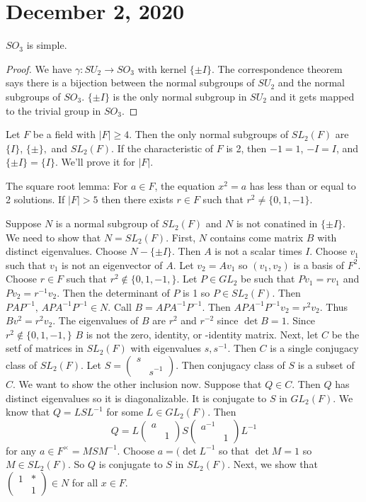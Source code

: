 \documentclass{article}
\newcommand{\ra}[1][]{\xrightarrow{#1}}
\begin{document}
\section{December 2, 2020}
\begin{corollary}
$SO_3$ is simple.
\end{corollary}
\begin{proof}
We have $\gamma: SU_2\ra SO_3$ with kernel $\{\pm I\}$. The correspondence theorem says there is a bijection between the normal subgroups of $SU_2$ and the normal subgroups of $SO_3$. $\{\pm I\}$ is the only normal subgroup in $SU_2$ and it gets mapped to the trivial group in $SO_3$. 
\end{proof}
\begin{theorem}
Let $F$ be a field with $|F|\geq 4$. Then the only normal subgroups of $SL_2(F)$ are $\{I\}$, $\{\pm\},$ and $SL_2(F)$. If the characteristic of $F$ is 2, then $-1=1$, $-I=I$, and $\{\pm I\}=\{I\}$. We'll prove it for $|F|$. 

The square root lemma: For $a\in F$, the equation $x^2=a$ has less than or equal to 2 solutions. If $|F|>5$ then there exists $r\in F$ such that $r^2\neq \{0,1,-1\}$.

Suppose $N$ is a normal subgroup of $SL_2(F)$ and $N$ is not conatined in $\{\pm I\}$. We need to show that $N=SL_2(F)$. First, $N$ contains come matrix $B$ with distinct eigenvalues. Choose $N-\{\pm I\}$. Then $A$ is not a scalar times $I$. Choose $v_1$ such that $v_1$ is not an eigenvector of $A$. Let $v_2=Av_1$ so $(v_1,v_2)$ is a basis of $F^2$. Choose $r\in F$ such that $r^2\notin\{0,1,-1,\}$. Let $P\in GL_2$ be such that $Pv_1=rv_1$ and $Pv_2=r^{-1}v_2$. Then the determinant of $P$ is 1 so $P\in SL_2(F)$. Then $PAP^{-1},\, APA^{-1}P^{-1}\in N$. Call $B=APA^{-1}P^{-1}$. Then $APA^{-1}P^{-1}v_2=r^2v_2$. Thus $Bv^2=r^2v_2$. The eigenvalues of $B$ are $r^2$ and $r^{-2}$ since $\det B=1$. Since $r^2\notin\{0,1,-1,\}$ $B$ is not the zero, identity, or -identity matrix. Next, let $C$ be the setf of matrices in $SL_2(F)$ with eigenvalues $s,s^{-1}$. Then $C$ is a single conjugacy class of $SL_2(F)$. Let $S=\begin{pmatrix} s&\\&s^{-1}\end{pmatrix}$. Then conjugacy class of $S$ is a subset of $C$. We want to show the other inclusion now. Suppose that $Q\in C$. Then $Q$ has distinct eigenvalues so it is diagonalizable. It is conjugate to $S$ in $GL_2(F)$. We know that $Q=LSL^{-1}$ for some $L\in GL_2(F)$. Then 
$$Q=L\begin{pmatrix}
a&\\&1
\end{pmatrix}S\begin{pmatrix}
a^{-1}&\\&1
\end{pmatrix}L^{-1}$$ for any $a\in F^\times=MSM^{-1}$. Choose $a=(\det L^{-1}$ so that $\det M=1$ so $M\in SL_2(F)$. So $Q$ is conjugate to $S$ in $SL_2(F)$. Next, we show that $\begin{pmatrix}
1&*\\&1
\end{pmatrix}\in N$ for all $x\in F$. 
\end{theorem}
\end{document}
